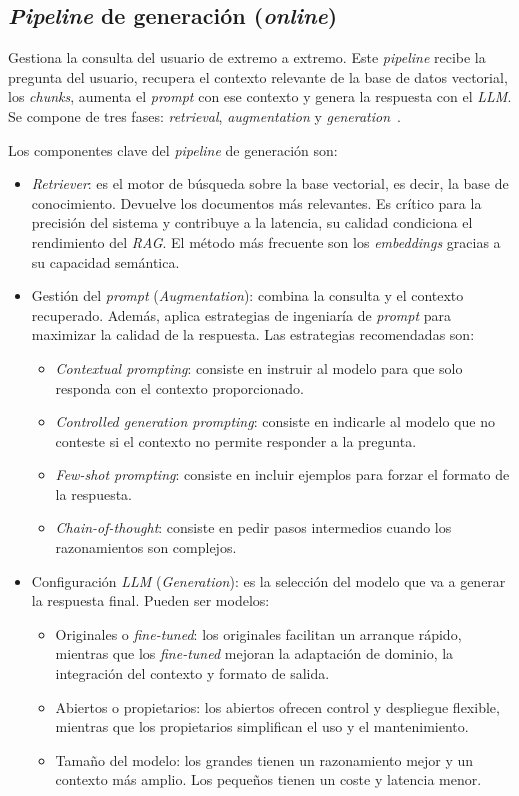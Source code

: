 \subsection{\textit{Pipeline} de generación (\textit{online})}
Gestiona la consulta del usuario de extremo a extremo. Este \textit{pipeline} recibe la pregunta del usuario, recupera el contexto relevante de la base de datos vectorial, los \textit{chunks}, aumenta el \textit{prompt} con ese contexto y genera la respuesta con el \textit{LLM}. Se compone de tres fases: \textit{retrieval}, \textit{augmentation} y \textit{generation}~\cite{book:RAG_SimpleGuide}. 

Los componentes clave del \textit{pipeline} de generación son:
\begin{itemize}
\tightlist
	\item \textit{Retriever}: es el motor de búsqueda sobre la base vectorial, es decir, la base de conocimiento. Devuelve los documentos más relevantes. Es crítico para la precisión del sistema y contribuye a la latencia, su calidad condiciona el rendimiento del \textit{RAG}. El método más frecuente son los \textit{embeddings} gracias a su capacidad semántica.
	\item Gestión del \textit{prompt} (\textit{Augmentation}): combina la consulta y el contexto recuperado. Además, aplica estrategias de ingeniaría de \textit{prompt} para maximizar la calidad de la respuesta. Las estrategias recomendadas son:
	\begin{itemize}
	\tightlist
		\item \textit{Contextual prompting}: consiste en instruir al modelo para que solo responda con el contexto proporcionado.
		\item \textit{Controlled generation prompting}: consiste en indicarle al modelo que no conteste si el contexto no permite responder a la pregunta.
		\item \textit{Few-shot prompting}: consiste en incluir ejemplos para forzar el formato de la respuesta.
		\item \textit{Chain-of-thought}: consiste en pedir pasos intermedios cuando los razonamientos son complejos.
	\end{itemize}
	\item Configuración \textit{LLM} (\textit{Generation}): es la selección del modelo que va a generar la respuesta final. Pueden ser modelos:
	\begin{itemize}
	\tightlist
		\item Originales o \textit{fine-tuned}: los originales facilitan un arranque rápido, mientras que los \textit{fine-tuned} mejoran la adaptación de dominio, la integración del contexto y formato de salida.
		\item Abiertos o propietarios: los abiertos ofrecen control y despliegue flexible, mientras que los propietarios simplifican el uso y el mantenimiento.
		\item Tamaño del modelo: los grandes tienen un razonamiento mejor y un contexto más amplio. Los pequeños tienen un coste y latencia menor.
	\end{itemize}
\end{itemize} 

